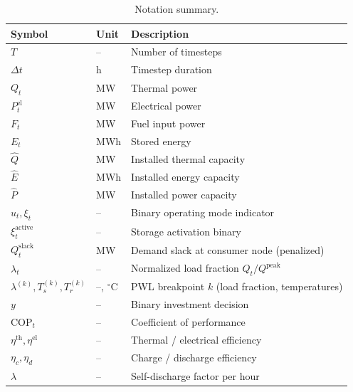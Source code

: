 \documentclass[a4paper,12pt]{article}
\newcommand{\COP}{\mathrm{COP}}
\begin{document}
\begin{table}[h!]
  \centering
  \caption{Notation summary.}
  \begin{tabular}{@{}lll@{}}
    \toprule
    Symbol & Unit & Description \\
    \midrule
    $T$                              & --             & Number of timesteps \\
    $\Delta t$                       & h              & Timestep duration \\
    $Q_t$                            & MW             & Thermal power \\
    $P^{\text{el}}_t$                & MW             & Electrical power \\
    $F_t$                            & MW             & Fuel input power \\
    $E_t$                            & MWh            & Stored energy \\
    $\hat{Q}$                        & MW             & Installed thermal capacity \\
    $\hat{E}$                        & MWh            & Installed energy capacity \\
    $\hat{P}$                        & MW             & Installed power capacity \\
    $u_t, \xi_t$                     & --             & Binary operating mode indicator \\
    $\xi^{\text{active}}_t$          & --             & Storage activation binary \\
    $Q^{\text{slack}}_t$             & MW             & Demand slack at consumer node (penalized) \\
    $\lambda_t$                      & --             & Normalized load fraction $Q_t / Q^{\text{peak}}$ \\
    $\lambda^{(k)}, T^{(k)}_s, T^{(k)}_r$ & --, $^\circ$C & PWL breakpoint $k$ (load fraction, temperatures) \\
    $y$                              & --             & Binary investment decision \\
    $\COP_t$                         & --             & Coefficient of performance \\
    $\eta^{\text{th}}, \eta^{\text{el}}$ & --         & Thermal / electrical efficiency \\
    $\eta_c, \eta_d$                 & --             & Charge / discharge efficiency \\
    $\lambda$                        & --             & Self-discharge factor per hour \\

\end{tabular}
\end{table}
\end{document}
